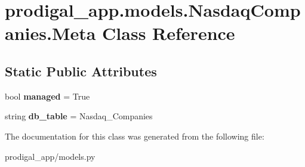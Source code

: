 \hypertarget{classprodigal__app_1_1models_1_1_nasdaq_companies_1_1_meta}{}\section{prodigal\+\_\+app.\+models.\+Nasdaq\+Companies.\+Meta Class Reference}
\label{classprodigal__app_1_1models_1_1_nasdaq_companies_1_1_meta}
\subsection*{Static Public Attributes}
\begin{DoxyCompactItemize}
\item 
\mbox{\label{classprodigal__app_1_1models_1_1_nasdaq_companies_1_1_meta_a90d6c22827962bd37e30c5c74421945b}} 
bool {\bfseries managed} = True
\item 
\mbox{\label{classprodigal__app_1_1models_1_1_nasdaq_companies_1_1_meta_a839a89ef58065155781df110e5fd41a2}} 
string {\bfseries db\+\_\+table} = \textquotesingle{}Nasdaq\+\_\+\+Companies\textquotesingle{}
\end{DoxyCompactItemize}


The documentation for this class was generated from the following file\+:\begin{DoxyCompactItemize}
\item 
prodigal\+\_\+app/models.\+py\end{DoxyCompactItemize}
